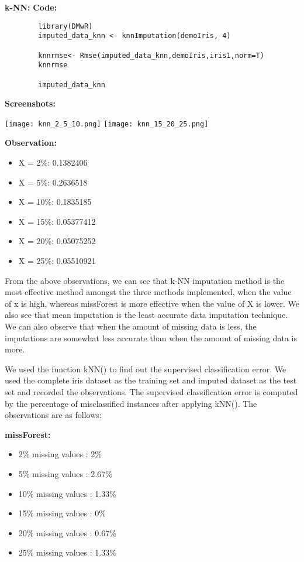 \documentclass{article}
\begin{document}
\textbf{k-NN:}\newline\newline
\textbf{Code:}
	\begin{lstlisting}
		library(DMwR)
		imputed_data_knn <- knnImputation(demoIris, 4)
		
		knnrmse<- Rmse(imputed_data_knn,demoIris,iris1,norm=T)
		knnrmse
		
		imputed_data_knn
	\end{lstlisting}
\textbf{Screenshots:}
\begin{center}
	\texttt{[image: knn\_2\_5\_10.png]}
	\texttt{[image: knn\_15\_20\_25.png]}
\end{center}
\textbf{Observation:}
\begin{itemize}
	\item X = 2\%: 0.1382406
	\item X = 5\%: 0.2636518
	\item X = 10\%: 0.1835185
	\item X = 15\%: 0.05377412
	\item X = 20\%: 0.05075252
	\item X = 25\%: 0.05510921
	
	
	
\end{itemize}
From the above observations, we can see that k-NN imputation method is the most effective method amongst the three methods implemented, when the value of x is high, whereas missForest is more effective when the value of X is lower. We also see that mean imputation is the least accurate data imputation technique. We can also observe that when the amount of missing data is less, the imputations are somewhat less accurate than when the amount of missing data is more.\newline
\linebreak

We used the function kNN() to find out the supervised classification error. We used the complete iris dataset as the training set and imputed dataset as the test set and recorded the observations. The supervised classification error is computed by the percentage of misclassified instances after applying kNN(). The observations are as follows:
\linebreak

\textbf{missForest:}
\linebreak

\begin{itemize}
	\item 2\% missing values : 2\%
	\item 5\% missing values : 2.67\%
	\item 10\% missing values : 1.33\%
	\item 15\% missing values : 0\%
	\item 20\% missing values : 0.67\%
	\item 25\% missing values : 1.33\%
\end{itemize}
\end{document}
